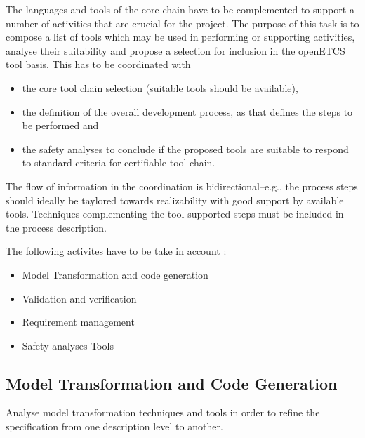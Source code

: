 \documentclass{template/openetcs_article}
\begin{document}
The languages and tools  of the core chain have to be complemented to support a number of activities that are crucial for the project. The purpose of this task is to compose a list of tools which may be
used in performing or supporting  activities, analyse their
suitability and propose a selection for inclusion in the openETCS tool
basis. This has to be coordinated with 
\begin{itemize}
\item the core tool chain selection (suitable  tools should be
  available), 
\item the definition of the overall development process, as that defines the steps to be performed and 
\item the safety analyses to  conclude if the proposed tools are suitable to  respond to standard criteria for certifiable tool chain.
\end{itemize}
  The flow of information in the coordination is bidirectional--e.g., the process
steps should ideally be taylored towards realizability with good
support by available tools. Techniques complementing the
tool-supported steps must be included in the process description. 
  
The following activites have to be take in account :
\begin{itemize}
\item Model Transformation and code generation
\item Validation and verification
\item Requirement management
\item Safety analyses Tools
\end{itemize}


\subsection{Model Transformation and Code Generation}

Analyse model transformation techniques and tools in order to refine the specification from one description level to another.

\end{document}
